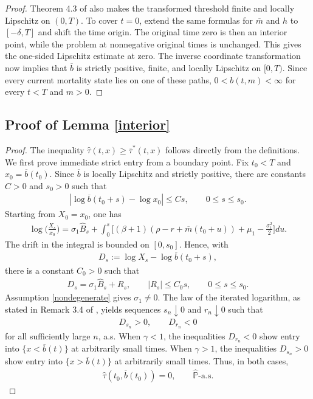 \documentclass[a4paper,11pt]{amsart}
\numberwithin{equation}{section}
\begin{document}
{\begin{proof}
Theorem 4.3 of \cite{de2019lipschitz} also makes the transformed threshold finite and locally Lipschitz on $(0,T)$. To cover $t=0$, extend the same formulas for $\overline m$ and $h$ to $[-\delta,T]$ and shift the time origin. The original time zero is then an interior point, while the problem at nonnegative original times is unchanged. This gives the one-sided Lipschitz estimate at zero. The inverse coordinate transformation now implies that $\overline b$ is strictly positive, finite, and locally Lipschitz on $[0,T)$. Since every current mortality state lies on one of these paths, $0<b(t,m)<\infty$ for every $t<T$ and $m>0$.
\end{proof}

\subsection{Proof of Lemma \ref{interior} }\label{prointerior}
\begin{proof}
{\color{black}
The inequality $\widehat\tau(t,x)\geq\overline\tau^\ast(t,x)$ follows directly from the definitions. We first prove immediate strict entry from a boundary point. Fix $t_0<T$ and $x_0=\overline b(t_0)$. Since $\overline b$ is locally Lipschitz and strictly positive, there are constants $C>0$ and $s_0>0$ such that
\begin{align*}
|\log\overline b(t_0+s)-\log x_0|\leq Cs,\qquad0\leq s\leq s_0.
\end{align*}
Starting from $X_0=x_0$, one has
\begin{align*}
\log\bigg(\frac{X_s}{x_0}\bigg)=\sigma_1\widehat B_s+\int_0^s\bigg[(\beta+1)(\rho-r+\overline m(t_0+u))+\mu_1-\frac{\sigma_1^2}{2}\bigg]du.
\end{align*}
The drift in the integral is bounded on $[0,s_0]$. Hence, with
\begin{align*}
D_s:=\log X_s-\log\overline b(t_0+s),
\end{align*}
there is a constant $C_0>0$ such that
\begin{align*}
D_s=\sigma_1\widehat B_s+R_s,\qquad|R_s|\leq C_0s,\qquad0\leq s\leq s_0.
\end{align*}
Assumption \ref{nondegenerate} gives $\sigma_1\neq0$. The law of the iterated logarithm, as stated in Remark 3.4 of \citet{baldi2017stochastic}, yields sequences $s_n\downarrow0$ and $r_n\downarrow0$ such that
\begin{align*}
D_{s_n}>0,\qquad D_{r_n}<0
\end{align*}
for all sufficiently large $n$, a.s. When $\gamma<1$, the inequalities $D_{r_n}<0$ show entry into $\{x<\overline b(t)\}$ at arbitrarily small times. When $\gamma>1$, the inequalities $D_{s_n}>0$ show entry into $\{x>\overline b(t)\}$ at arbitrarily small times. Thus, in both cases,
\begin{align*}
\widehat\tau(t_0,\overline b(t_0))=0,\qquad\widehat{\mathbb P}\text{-a.s.}
\end{align*}

}
\end{proof}}
\end{document}
